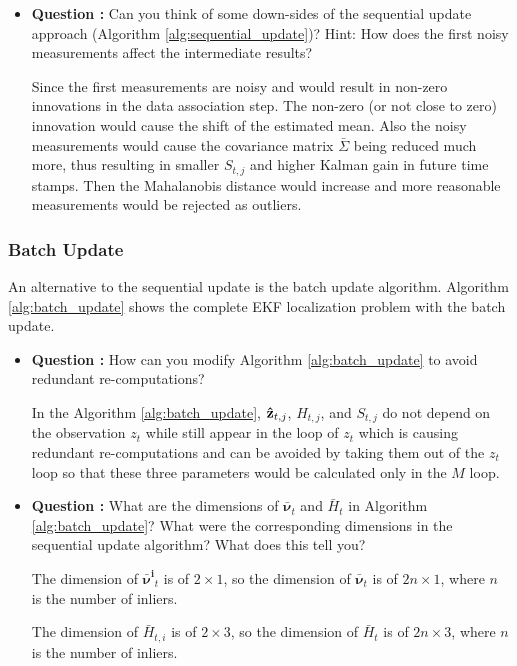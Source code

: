 \documentclass[11pt,a4paper]{article}
\begin{document}
\begin{itemize}
	\item \addtocounter{cnt_questions}{1} \textbf{Question :} Can you think of some down-sides of the sequential update approach (Algorithm \ref{alg:sequential_update})? Hint: How does the first noisy measurements affect the intermediate results?
		\par Since the first measurements are noisy and would result in non-zero innovations in the data association step. The non-zero (or not close to zero) innovation would cause the shift of the estimated mean. Also the noisy measurements would cause the covariance matrix $\bar{\Sigma}$ being reduced much more, thus resulting in smaller $S_{t,j}$ and higher Kalman gain in future time stamps. Then the Mahalanobis distance would increase and more reasonable measurements would be rejected as outliers.
\end{itemize}

\subsubsection{Batch Update}
An alternative to the sequential update is the batch update algorithm. Algorithm \ref{alg:batch_update} shows the complete EKF localization problem with the batch update.

\begin{itemize}
	\item \addtocounter{cnt_questions}{1} \textbf{Question :} How can you modify Algorithm \ref{alg:batch_update} to avoid redundant re-computations?
		\par In the Algorithm \ref{alg:batch_update}, ${\bf\hat z}_{t,j}$, $H_{t,j}$, and $S_{t,j}$ do not depend on the observation $z_{t}$ while still appear in the loop of $z_{t}$ which is causing redundant re-computations and can be avoided by taking them out of the $z_{t}$ loop so that these three parameters would be calculated only in the $M$ loop.
	
	\item \addtocounter{cnt_questions}{1} \textbf{Question :} What are the dimensions of $\boldsymbol{\bar\nu}_{t}$ and $\bar H_t$ in Algorithm \ref{alg:batch_update}? What were the corresponding dimensions in the sequential update algorithm? What does this tell you?
		\par The dimension of $\boldsymbol{\bar{\nu}^{i}}_{t}$ is of $2 \times 1$, so the dimension of $\boldsymbol{\bar{\nu}}_{t}$ is of $2n \times 1$, where $n$ is the number of inliers.
		\par The dimension of $\bar{H}_{t,i}$ is of $2 \times 3$, so the dimension of $\bar H_t$ is of $2n \times 3$, where $n$ is the number of inliers.
\end{itemize}
\end{document}
